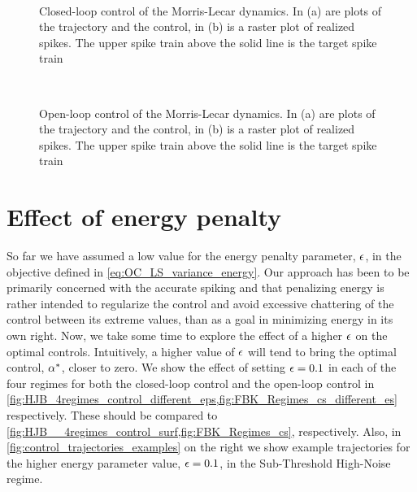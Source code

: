 \begin{figure}[h]
\begin{center}
\\
\caption[labelInTOC]{Closed-loop control of the Morris-Lecar
  dynamics. In (a) are plots of the trajectory and the control, in (b)
  is a raster plot of realized spikes. The upper spike train above the
solid line is the target spike train}
\label{fig:ML_controled_simulation_cl}
\end{center}
\end{figure} 
\begin{figure}[h] 
\begin{center}
\\
\caption[labelInTOC]{Open-loop control of the Morris-Lecar
  dynamics. In (a) are plots of the trajectory and the control, in (b)
  is a raster plot of realized spikes. The upper spike train above the
solid line is the target spike train}
\label{fig:ML_controled_simulation_ol}
\end{center}
\end{figure} 

\section{Effect of energy penalty}
\label{sec:effect_of_eps}
So far we have assumed a low value for the energy penalty parameter, ${\epsilon}$, in
the objective defined in \cref{eq:OC_LS_variance_energy}. Our approach has been
to be primarily concerned with the accurate spiking and that penalizing energy
is rather intended to regularize the control and avoid excessive chattering of
the control between its extreme values, than as a goal in minimizing energy in
its own right. Now, we take some time to explore the effect of a higher ${\epsilon}$
on the optimal controls. Intuitively, a higher value of ${\epsilon}$ will tend to
bring the optimal control, $\alpha^*$, closer to zero. We show the effect of setting
${\epsilon} = 0.1$ in each of the four regimes for both the closed-loop control and
the open-loop control in
\cref{fig:HJB_4regimes_control_different_eps,fig:FBK_Regimes_cs_different_es}
respectively. These should be compared to
\cref{fig:HJB__4regimes_control_surf,fig:FBK_Regimes_cs}, respectively.
Also, in \cref{fig:control_trajectories_examples} on the right we
show example trajectories for the higher energy parameter value, ${\epsilon}=0.1$, in
the Sub-Threshold High-Noise regime.

